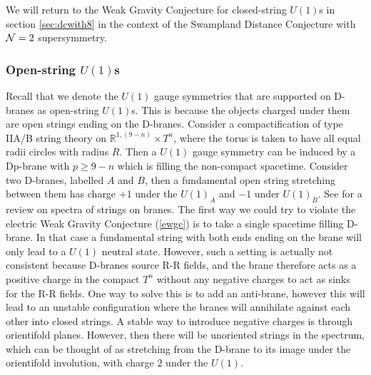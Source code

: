 \documentclass[11pt,a4paper]{article}
\numberwithin{equation}{section}
\numberwithin{table}{section}\setlength{\multlinegap}{25pt}
\begin{document}
We will return to the Weak Gravity Conjecture for closed-string $U(1)$s in section \ref{sec:dcwith8} in the context of the Swampland Distance Conjecture with ${\cal N}=2$ supersymmetry. 

\subsubsection{Open-string $U(1)$s}
\label{sec:wgciios}

Recall that we denote the $U(1)$ gauge symmetries that are supported on D-branes as open-string $U(1)$s. This is because the objects charged under them are open strings ending on the D-branes. Consider a compactification of type IIA/B string theory on $\mathbb{R}^{1,(9-n)}\times T^{n}$, where the torus is taken to have all equal radii circles with radius $R$. Then a $U(1)$ gauge symmetry can be induced by a Dp-brane with $p \geq 9-n$ which is filling the non-compact spacetime. Consider two D-branes, labelled $A$ and $B$, then a fundamental open string stretching between them has charge $+1$ under the $U(1)_A$ and $-1$ under $U(1)_B$. See \cite{Blumenhagen:2013fgp,Johnson:2003gi,Marchesano:2007de,Maharana:2012tu} for a review on spectra of strings on branes. The first way we could try to violate the electric Weak Gravity Conjecture (\ref{ewgc}) is to take a single spacetime filling D-brane. In that case a fundamental string with both ends ending on the brane will only lead to a $U(1)$ neutral state. However, such a setting is actually not consistent because D-branes source R-R fields, and the brane therefore acts as a positive charge in the compact $T^n$ without any negative charges to act as sinks for the R-R fields. One way to solve this is to add an anti-brane, however this will lead to an unstable configuration where the branes will annihilate against each other into closed strings. A stable way to introduce negative charges is through orientifold planes. However, then there will be unoriented strings in the spectrum, which can be thought of as stretching from the D-brane to its image under the orientifold involution, with charge $2$ under the $U(1)$. 
\end{document}
